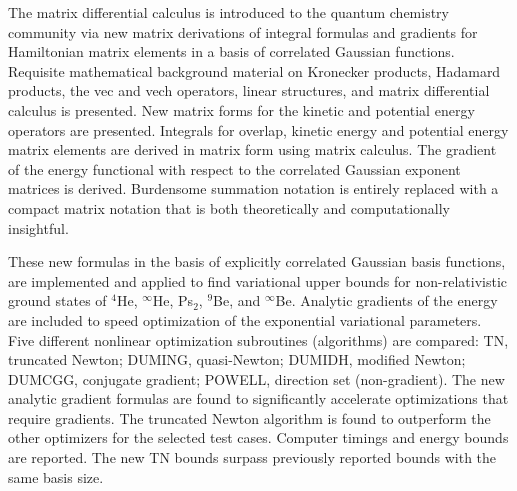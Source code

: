 \documentclass[12pt,thmsa]{article}
\begin{document}
The matrix differential calculus is introduced to the quantum chemistry
community via new matrix derivations of integral formulas and gradients for
Hamiltonian matrix elements in a basis of correlated Gaussian functions.
Requisite mathematical background material on Kronecker products, Hadamard
products, the vec and vech operators, linear structures, and matrix
differential calculus is presented. New matrix forms for the kinetic and
potential energy operators are presented. Integrals for overlap, kinetic
energy and potential energy matrix elements are derived in matrix form using
matrix calculus. The gradient of the energy functional with respect to the
correlated Gaussian exponent matrices is derived. Burdensome summation
notation is entirely replaced with a compact matrix notation that is both
theoretically and computationally insightful.

These new formulas in the basis of explicitly correlated Gaussian basis
functions, are implemented and applied to find variational upper bounds for
non-relativistic ground states of $^4$He, $^\infty $He, Ps$_2$, $^9$Be, and $%
^\infty $Be. Analytic gradients of the energy are included to speed
optimization of the exponential variational parameters. Five different
nonlinear optimization subroutines (algorithms) are compared: TN, truncated
Newton; DUMING, quasi-Newton; DUMIDH, modified Newton; DUMCGG, conjugate
gradient; POWELL, direction set (non-gradient). The new analytic gradient
formulas are found to significantly accelerate optimizations that require
gradients. The truncated Newton algorithm is found to outperform the other
optimizers for the selected test cases. Computer timings and energy bounds
are reported. The new TN bounds surpass previously reported bounds with the
same basis size.
\end{document}
